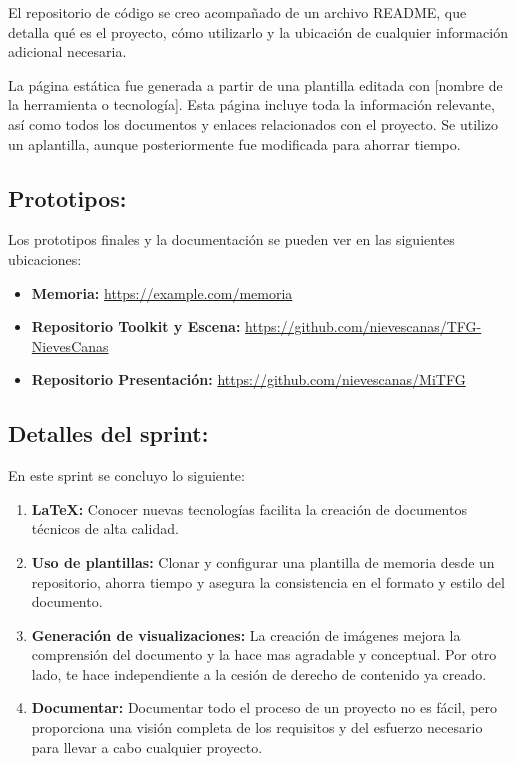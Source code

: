 \documentclass[a4paper, 12pt]{book}
\begin{document}
            El repositorio de código se creo acompañado de un archivo README, que detalla qué es el proyecto, cómo utilizarlo y la ubicación de cualquier información adicional necesaria.
            
            La página estática fue generada a partir de una plantilla editada con [nombre de la herramienta o tecnología]. Esta página incluye toda la información relevante, así como todos los documentos y enlaces relacionados con el proyecto. Se utilizo un aplantilla, aunque posteriormente fue modificada para ahorrar tiempo.

            \subsection{Prototipos:}

            Los prototipos finales y la documentación se pueden ver en las siguientes ubicaciones:

\begin{itemize}
    \item \textbf{Memoria:} \url{https://example.com/memoria}
    \item \textbf{Repositorio Toolkit y Escena:} \url{https://github.com/nievescanas/TFG-NievesCanas}
    \item \textbf{Repositorio Presentación:} \url{https://github.com/nievescanas/MiTFG}
\end{itemize}

            \subsection{Detalles del sprint:}

            En este sprint se concluyo lo siguiente:
            \begin{enumerate}

                \item \textbf{LaTeX:} Conocer nuevas tecnologías facilita la creación de documentos técnicos de alta calidad.
                
                \item \textbf{Uso de plantillas:} Clonar y configurar una plantilla de memoria desde un repositorio, ahorra tiempo y asegura la consistencia en el formato y estilo del documento.               
                
                \item \textbf{Generación de visualizaciones:} La creación de imágenes
                mejora la comprensión del documento y la hace mas agradable y conceptual. Por otro lado, te hace independiente a la cesión de derecho de contenido ya creado. 
                
                \item \textbf{Documentar:} Documentar todo el proceso de un proyecto no es fácil, pero proporciona una visión completa de los requisitos y del esfuerzo necesario para llevar a cabo cualquier proyecto. 
                
            \end{enumerate}
\end{document}
